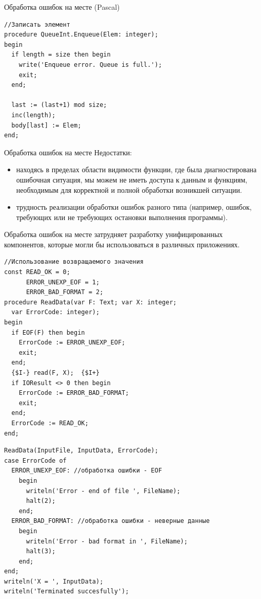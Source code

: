 \documentclass[xcolor=table]{beamer}
\begin{document}
\begin{frame}{Обработка ошибок на месте (Pascal)}
	\begin{verbatim}
//Записать элемент
procedure QueueInt.Enqueue(Elem: integer); 
begin
  if length = size then begin
   	write('Enqueue error. Queue is full.');
    exit;
  end;
	  
  last := (last+1) mod size;
  inc(length);
  body[last] := Elem;
end;
	\end{verbatim}
\end{frame}

\begin{frame}[fragile]{Обработка ошибок на месте}
	Недостатки: 
	\begin{itemize}
		\item находясь в пределах области видимости функции, где была диагностирована ошибочная ситуация, мы можем не иметь доступа к данным и функциям, необходимым для корректной и полной обработки возникшей ситуации.
	\item трудность реализации обработки ошибок разного типа (например, ошибок, требующих или не требующих остановки выполнения программы).
	\end{itemize}
	Обработка ошибок на месте затрудняет разработку унифицированных компонентов, которые могли бы использоваться в различных приложениях.
\end{frame}

\begin{frame}[fragile]
	\begin{verbatim}
//Использование возвращаемого значения
const READ_OK = 0;
      ERROR_UNEXP_EOF = 1;
      ERROR_BAD_FORMAT = 2;
procedure ReadData(var F: Text; var X: integer; 
  var ErrorCode: integer);
begin
  if EOF(F) then begin
    ErrorCode := ERROR_UNEXP_EOF;
    exit;
  end;
  {$I-} read(F, X);  {$I+}
  if IOResult <> 0 then begin
    ErrorCode := ERROR_BAD_FORMAT;
    exit;
  end;
  ErrorCode := READ_OK;
end; 
	\end{verbatim}
\end{frame}

\begin{frame}[fragile]
	\begin{verbatim}
ReadData(InputFile, InputData, ErrorCode);
case ErrorCode of
  ERROR_UNEXP_EOF: //обработка ошибки - EOF
    begin
      writeln('Error - end of file ', FileName);
      halt(2);
    end;
  ERROR_BAD_FORMAT: //обработка ошибки - неверные данные
    begin
      writeln('Error - bad format in ', FileName);
      halt(3);
    end;
end;
writeln('X = ', InputData);
writeln('Terminated succesfully');
	\end{verbatim}
\end{frame}
\end{document}
